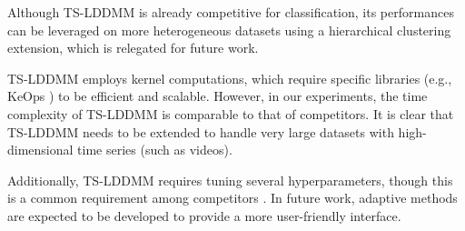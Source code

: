 Although TS-LDDMM is already competitive for classification, its performances can be leveraged on more heterogeneous datasets using a hierarchical clustering extension, which is relegated for future work. 

TS-LDDMM employs kernel computations, which require specific libraries (e.g., KeOps \cite{charlier2021kernel}) to be efficient and scalable. However, in our experiments, the time complexity of TS-LDDMM is comparable to that of competitors.
 It is clear that TS-LDDMM needs to be extended to handle very large datasets with high-dimensional time series (such as videos).
 
Additionally, TS-LDDMM requires tuning several hyperparameters, though this is a common requirement among competitors \cite{glaunes2008large, oh2024stable, wu2024shape, heo2024logistic}. In future work, adaptive methods are expected to be developed to provide a more user-friendly interface.
